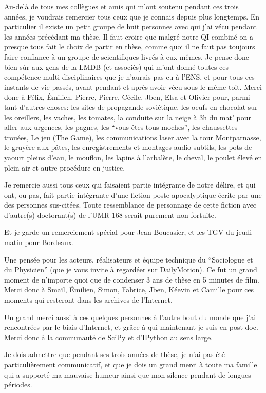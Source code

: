 \documentclass[A4paperpaper,11pt,english]{sphinxmanual}
\begin{document}
Au-delà de tous mes collègues et amis qui m'ont soutenu pendant ces trois
années, je voudrais remercier tous ceux que je connais depuis plus longtemps.
En particulier il existe un petit groupe de huit personnes avec qui j'ai vécu
pendant les années précédant ma thèse. Il faut croire que malgré notre QI
combiné on a presque tous fait le choix de partir en thèse, comme quoi il ne
faut pas toujours faire confiance à un groupe de scientifiques livrés à eux-mêmes.
Je pense donc bien sûr aux gens de la LMDB (et associés) qui m'ont donné
toutes ces compétence multi-disciplinaires que je n'aurais pas eu à l'ENS, et
pour tous ces instants de vie passés, avant pendant et après avoir vécu sous le
même toit. Merci donc à Félix, Émilien, Pierre, Pierre, Cécile, Jben, Elsa et
Olivier pour, parmi tant d'autres choses: les sites de propagande soviétique, les
oeufs en chocolat sur les oreillers, les vaches, les tomates, la conduite sur
la neige à 3h du mat' pour aller aux urgences, les pagnes, les ``vous êtes tous
moches'', les chaussettes trouées, Le jeu (The Game), les communications laser
avec la tour Montparnasse, le gruyère aux pâtes, les enregistrements et montages
audio subtils, les pots de yaourt pleins d'eau, le mouflon, les lapins à
l'arbalète, le cheval, le poulet élevé en plein air et autre procédure en justice.

Je remercie aussi tous ceux qui faisaient partie intégrante de notre délire, et
qui ont, ou pas, fait partie intégrante d'une fiction poste apocalyptique
écrite par une des personnes sus-citées. Toute ressemblance de personnage de
cette fiction avec d'autre(s) doctorant(s) de l'UMR 168 serait purement non
fortuite.

Et je garde un remerciement spécial pour Jean Boucasier, et les TGV du jeudi
matin pour Bordeaux.

Une pensée pour les acteurs, réalisateurs et équipe technique du ``Sociologue et
du Physicien'' (que je vous invite à regardéer sur DailyMotion). Ce fut un grand
moment de n'importe quoi que de condenser 3 ans de thèse en 5 minutes de film.
Merci donc à Smaïl, Émilien, Simon, Fabrice, Jben, Kéevin et Camille pour ces
moments qui resteront dans les archives de l'Internet.

Un grand merci aussi à ces quelques personnes à l'autre bout du monde que j'ai
rencontrées par le biais d'Internet, et grâce à qui maintenant je suis en post-doc.
Merci donc à la communauté de SciPy et d'IPython au sens large.

Je dois admettre que pendant ses trois années de thèse, je n'ai pas été
particulièrement communicatif, et que je dois un grand merci à toute ma famille
qui a supporté ma mauvaise humeur ainsi que mon silence pendant de longues
périodes.
\end{document}
